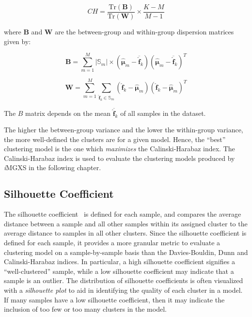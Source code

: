 \begin{equation}
\label{eqn:chap10-ch-index}
CH = \frac{\mathrm{Tr}(\boldsymbol{B})}{\mathrm{Tr}(\boldsymbol{W})} \times \frac{K-M}{M-1}
\end{equation}

\noindent where $\boldsymbol{B}$ and $\boldsymbol{W}$ are the between-group and within-group dispersion matrices given by:

\begin{equation}
\label{eqn:chap10-ch-index-between-group-disp}
\boldsymbol{B} = \displaystyle\sum\limits_{m=1}^{M} |\mathbb{S}_{m}| \times \left(\boldsymbol{\hat{\mu}}_{m} - \overline{\boldsymbol{\hat{f}}}_{k}\right)\left(\boldsymbol{\hat{\mu}}_{m} - \overline{\boldsymbol{\hat{f}}}_{k}\right)^{T}
\end{equation}

\begin{equation}
\label{eqn:chap10-ch-index-within-group-disp}
\boldsymbol{W} = \displaystyle\sum\limits_{m=1}^{M} \displaystyle\sum\limits_{\boldsymbol{\hat{f}}_{k} \in \mathbb{S}_{m}} \left(\boldsymbol{\hat{f}}_{k} - \boldsymbol{\hat{\mu}}_{m}\right)\left(\boldsymbol{\hat{f}}_{k} - \boldsymbol{\hat{\mu}}_{m}\right)^{T}
\end{equation}

\noindent The $B$ matrix depends on the mean $\overline{\boldsymbol{\hat{f}}}_{k}$ of all samples in the dataset.

The higher the between-group variance and the lower the within-group variance, the more well-defined the clusters are for a given model. Hence, the ``best'' clustering model is the one which \textit{maximizes} the Calinski-Harabaz index. The Calinski-Harabaz index is used to evaluate the clustering models produced by \textit{i}\ac{MGXS} in the following chapter.


\subsection{Silhouette Coefficient}
\label{subsec:chap10-silhouette-coeff}

The silhouette coefficient~\cite{rousseeuw1987silhouette} is defined for each sample, and compares the average distance between a sample and all other samples within its assigned cluster to the average distance to samples in all other clusters. Since the silhouette coefficient is defined for each sample, it provides a more granular metric to evaluate a clustering model on a sample-by-sample basis than the Davies-Bouldin, Dunn and Calinski-Harabaz indices. In particular, a high silhouette coefficient signifies a ``well-clustered'' sample, while a low silhouette coefficient may indicate that a sample is an outlier. The distribution of silhouette coefficients is often visualized with a \textit{silhouette plot} to aid in identifying the quality of each cluster in a model. If many samples have a low silhouette coefficient, then it may indicate the inclusion of too few or too many clusters in the model.


